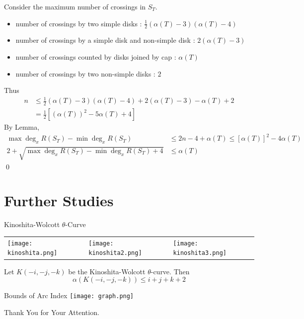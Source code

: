 \begin{frame}
	Consider the maximum number of crossings in $S_T$.

	\begin{itemize}
		\item number of crossings by two simple disks : $\frac12\left(\alpha(T)-3\right)\left(\alpha(T)-4\right)$
		\item number of crossings by a simple disk and non-simple disk : $2\left(\alpha(T)-3\right)$
		\item number of crossings counted by disks joined by cap : $\alpha(T)$
		\item number of crossings by two non-simple disks : $2$
	\end{itemize}

	Thus
	\begin{align*}
		n & \le \frac12\left(\alpha(T)-3\right)\left(\alpha(T)-4\right) + 2\left(\alpha(T)-3\right) -\alpha(T) + 2\\
		& = \frac12\left[(\alpha(T))^2 - 5\alpha(T) + 4\right]
	\end{align*}
	By Lemma,
	\begin{align*}
		\max\deg_xR(S_T) - \min\deg_xR(S_T) & \le 2n - 4 + \alpha(T) \le \left[\alpha(T)\right]^2 - 4\alpha(T)\\
		2 + \sqrt{\max\deg_xR(S_T) - \min\deg_xR(S_T) + 4} & \le \alpha(T)
	\end{align*}
	\hfill\qed
\end{frame}


\section{Further Studies}

\begin{frame}{Kinoshita-Wolcott $\theta$-Curve}
	\begin{tabu}{XXX}
		\texttt{[image: kinoshita.png]} & \texttt{[image: kinoshita2.png]} & \texttt{[image: kinoshita3.png]}
	\end{tabu}

	\begin{thm}
	Let $K(-i,-j,-k)$ be the Kinoshita-Wolcott $\theta$-curve.
	Then
	\[
		\alpha(K(-i,-j,-k)) \le i + j + k + 2
	\]
	\end{thm}
\end{frame}


\begin{frame}{Bounds of Arc Index}
	\texttt{[image: graph.png]}
\end{frame}


\begin{frame}
	\begin{center}
		\huge Thank You for Your Attention.
	\end{center}
\end{frame}


